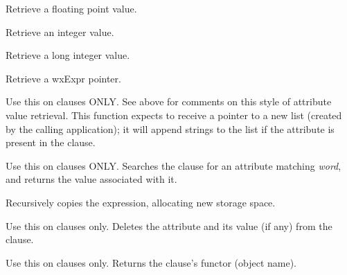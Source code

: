 Retrieve a floating point value.


Retrieve an integer value.


Retrieve a long integer value.


Retrieve a wxExpr pointer.

\label{wxexprgetattributestringlist}


Use this on clauses ONLY. See above for comments on this style of
attribute value retrieval. This function expects to receive a pointer to
a new list (created by the calling application); it will append strings
to the list if the attribute is present in the clause.

\label{wxexprattributevalue}


Use this on clauses ONLY. Searches the clause for an attribute
matching {\it word}, and returns the value associated with it.

\label{wxexprcopy}


Recursively copies the expression, allocating new storage space.

\label{wxexprdeletattributevalue}


Use this on clauses only. Deletes the attribute and its value (if any) from the
clause.

\label{wxexprfunctor}


Use this on clauses only. Returns the clause's functor (object name).

\label{wxexprgetclientdata}


